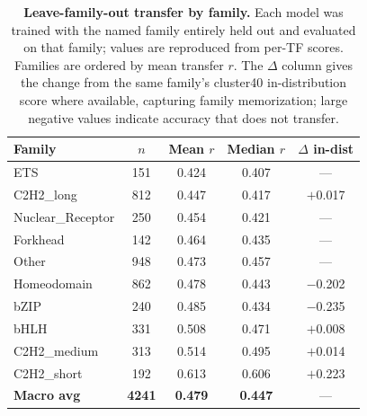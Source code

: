 \documentclass[11pt,letterpaper]{article}
\begin{document}
\begin{table}[p]
\centering
\caption{\textbf{Leave-family-out transfer by family.}
  Each model was trained with the named family entirely held out and evaluated on
  that family; values are reproduced from per-TF scores. Families are ordered by
  mean transfer $r$. The $\Delta$ column gives the change from the same family's
  cluster40 in-distribution score where available, capturing family memorization;
  large negative values indicate accuracy that does not transfer.}
\label{tab:lfo}
\smallskip
\renewcommand{\arraystretch}{1.2}
\begin{tabular}{@{}lcccc@{}}
\toprule
\textbf{Family} & \textbf{$n$} & \textbf{Mean $r$} & \textbf{Median $r$} & \textbf{$\Delta$ in-dist} \\
\midrule
ETS               & 151 & 0.424 & 0.407 & --- \\
C2H2\_long        & 812 & 0.447 & 0.417 & $+$0.017 \\
Nuclear\_Receptor & 250 & 0.454 & 0.421 & --- \\
Forkhead          & 142 & 0.464 & 0.435 & --- \\
Other             & 948 & 0.473 & 0.457 & --- \\
Homeodomain       & 862 & 0.478 & 0.443 & $-$0.202 \\
bZIP              & 240 & 0.485 & 0.434 & $-$0.235 \\
bHLH              & 331 & 0.508 & 0.471 & $+$0.008 \\
C2H2\_medium      & 313 & 0.514 & 0.495 & $+$0.014 \\
C2H2\_short       & 192 & 0.613 & 0.606 & $+$0.223 \\
\midrule
\textbf{Macro avg} & \textbf{4241} & \textbf{0.479} & \textbf{0.447} & --- \\
\bottomrule
\end{tabular}
\end{table}
\end{document}
